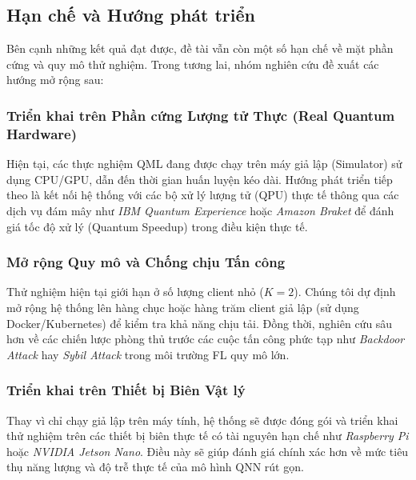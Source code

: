 \subsection{Hạn chế và Hướng phát triển}

Bên cạnh những kết quả đạt được, đề tài vẫn còn một số hạn chế về mặt phần cứng và quy mô thử nghiệm. Trong tương lai, nhóm nghiên cứu đề xuất các hướng mở rộng sau:

\subsubsection{Triển khai trên Phần cứng Lượng tử Thực (Real Quantum Hardware)}
Hiện tại, các thực nghiệm QML đang được chạy trên máy giả lập (Simulator) sử dụng CPU/GPU, dẫn đến thời gian huấn luyện kéo dài. Hướng phát triển tiếp theo là kết nối hệ thống với các bộ xử lý lượng tử (QPU) thực tế thông qua các dịch vụ đám mây như \textit{IBM Quantum Experience} hoặc \textit{Amazon Braket} để đánh giá tốc độ xử lý (Quantum Speedup) trong điều kiện thực tế.


\subsubsection{Mở rộng Quy mô và Chống chịu Tấn công}
Thử nghiệm hiện tại giới hạn ở số lượng client nhỏ ($K=2$). Chúng tôi dự định mở rộng hệ thống lên hàng chục hoặc hàng trăm client giả lập (sử dụng Docker/Kubernetes) để kiểm tra khả năng chịu tải. Đồng thời, nghiên cứu sâu hơn về các chiến lược phòng thủ trước các cuộc tấn công phức tạp như \textit{Backdoor Attack} hay \textit{Sybil Attack} trong môi trường FL quy mô lớn.

\subsubsection{Triển khai trên Thiết bị Biên Vật lý}
Thay vì chỉ chạy giả lập trên máy tính, hệ thống sẽ được đóng gói và triển khai thử nghiệm trên các thiết bị biên thực tế có tài nguyên hạn chế như \textit{Raspberry Pi} hoặc \textit{NVIDIA Jetson Nano}. Điều này sẽ giúp đánh giá chính xác hơn về mức tiêu thụ năng lượng và độ trễ thực tế của mô hình QNN rút gọn.